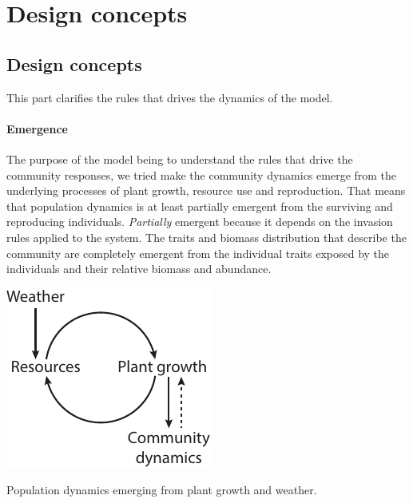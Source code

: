 \documentclass[a4paper,twoside, justified,marginals=raggedright, nobib]{tufte-handout}
\begin{document}
\section{Design concepts}

\subsection{Design concepts}
This part clarifies the rules that drives the dynamics of the model.

\paragraph{Emergence} 
The purpose of the model being to understand the rules that drive the community responses, we tried make the community dynamics emerge from the underlying processes of plant growth, resource use and reproduction. That means that population dynamics is at least partially emergent from the surviving and reproducing individuals.
\textit{Partially} emergent because it depends on the invasion rules applied to the system. The traits and biomass distribution that describe the community are completely emergent from the individual traits exposed by the individuals and their relative biomass and abundance.
\begin{marginfigure}
\includegraphics{./Figures/emergence.pdf}
\caption{Population dynamics emerging from plant growth and weather.}
\end{marginfigure}
\end{document}
